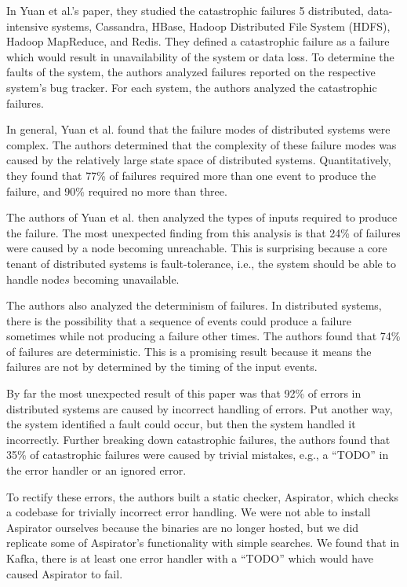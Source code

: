 \begin{multicols}{2}
In Yuan et al.'s paper, they studied the catastrophic failures 5 distributed, data-intensive systems, Cassandra, HBase, Hadoop Distributed File System (HDFS), Hadoop MapReduce, and Redis.
They defined a catastrophic failure as a failure which would result in unavailability of the system or data loss.
To determine the faults of the system, the authors analyzed failures reported on the respective system's bug tracker.
For each system, the authors analyzed the catastrophic failures.

In general, Yuan et al.
found that the failure modes of distributed systems were complex.
The authors determined that the complexity of these failure modes was caused by the relatively large state space of distributed systems.
Quantitatively, they found that 77\% of failures required more than one event to produce the failure, and 90\% required no more than three.

The authors of Yuan et al.
then analyzed the types of inputs required to produce the failure.
The most unexpected finding from this analysis is that 24\% of failures were caused by a node becoming unreachable.
This is surprising because a core tenant of distributed systems is fault-tolerance, i.e., the system should be able to handle node\(s\) becoming unavailable.

The authors also analyzed the determinism of failures.
In distributed systems, there is the possibility that a sequence of events could produce a failure sometimes while not producing a failure other times.
The authors found that 74\% of failures are deterministic.
This is a promising result because it means the failures are not by determined by the timing of the input events.

By far the most unexpected result of this paper was that 92\% of errors in distributed systems are caused by incorrect handling of errors.
Put another way, the system identified a fault could occur, but then the system handled it incorrectly.
Further breaking down catastrophic failures, the authors found that 35\% of catastrophic failures were caused by trivial mistakes, e.g., a ``TODO'' in the error handler or an ignored error.

To rectify these errors, the authors built a static checker, Aspirator, which checks a codebase for trivially incorrect error handling.
We were not able to install Aspirator ourselves because the binaries are no longer hosted, but we did replicate some of Aspirator's functionality with simple searches.
We found that in Kafka, there is at least one error handler with a ``TODO'' which would have caused Aspirator to fail.


\end{multicols}
